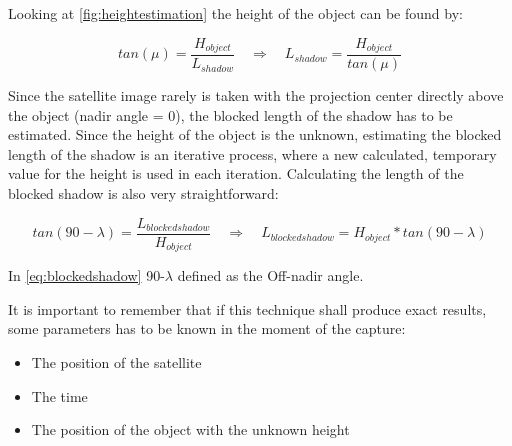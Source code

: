 Looking at \autoref{fig:heightestimation} the height of the object can be found by:

\begin{equation}
	tan(\mu) = \frac{H_{object}}{L_{shadow}} \quad \Rightarrow \quad L_{shadow} = \frac{H_{object}}{tan(\mu)}
\end{equation}

Since the satellite image rarely is taken with the projection center directly above the object (nadir angle = 0\textdegree), the blocked length of the shadow has to be estimated. Since the height of the object is the unknown, estimating the blocked length of the shadow is an iterative process, where a new calculated, temporary value for the height is used in each iteration. Calculating the length of the blocked shadow is also very straightforward: 

\begin{equation}\label{eq:blockedshadow}
	tan(90 - \lambda) = \frac{L_{blockedshadow}}{H_{object}} \quad \Rightarrow \quad L_{blockedshadow} = H_{object}*tan(90-\lambda)
\end{equation}

In \autoref{eq:blockedshadow} 90-$\lambda$ defined as the Off-nadir angle.

It is important to remember that if this technique shall produce exact results, some parameters has to be known in the moment of the capture:

\begin{itemize}
	\item The position of the satellite
	\item The time
	\item The position of the object with the unknown height
\end{itemize}
